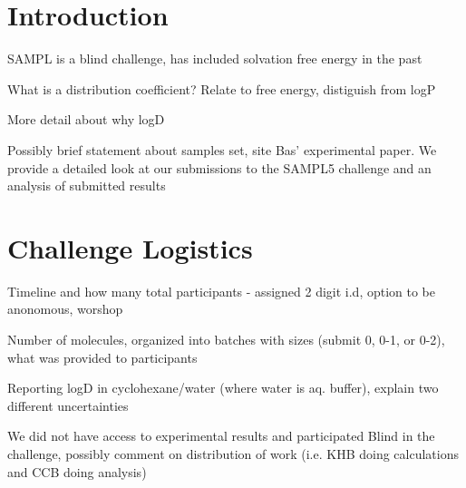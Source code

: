 \date{Received: date / Accepted: date}


\maketitle

\begin{abstract}
\end{abstract}



\section{Introduction}
\label{intro}
SAMPL is a blind challenge, has included solvation free energy in the past

What is a distribution coefficient? Relate to free energy, distiguish from logP

More detail about why logD

Possibly brief statement about samples set, site Bas' experimental paper. We provide a detailed look at our submissions to the SAMPL5 challenge and an analysis of submitted results


\section{Challenge Logistics}
\label{logistics}
Timeline and how many total participants - assigned 2 digit i.d, option to be anonomous, worshop

Number of molecules, organized into batches with sizes (submit 0, 0-1, or 0-2), what was provided to participants

Reporting logD in cyclohexane/water (where water is aq. buffer), explain two different uncertainties

We did not have access to experimental results and participated Blind in the challenge, possibly comment on distribution of work (i.e. KHB doing calculations and CCB doing analysis)

